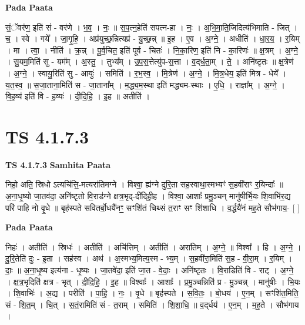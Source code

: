 \documentclass[17pt]{extarticle}
\begin{document}
\textbf{Pada Paata} \newline

सं॒ॅवर॑ण॒ इति॑ सं - वर॑णे । भ॒व॒ । नः॒ ॥ स॒प॒त्न॒हेति॑ सपत्न-हा । नः॒ । अ॒भि॒मा॒ति॒जिदित्य॑भिमाति - जित् । च॒ । स्वे । गये᳚ । जा॒गृ॒हि॒ । अप्र॑युच्छ॒न्नित्यप्र॑ - यु॒च्छ॒न्न् ॥ इ॒ह । ए॒व । अ॒ग्ने॒ । अधीति॑ । धा॒र॒य॒ । र॒यिम् । मा । त्वा॒ । नीति॑ । क्र॒न्न् । पू॒र्व॒चित॒ इति॑ पूर्व - चितः॑ । नि॒का॒रिण॒ इति॑ नि - का॒रिणः॑ ॥ क्ष॒त्रम् । अ॒ग्ने॒ । सु॒यम॒मिति॑ सु - यम᳚म् । अ॒स्तु॒ । तुभ्य᳚म् । उ॒प॒स॒त्तेत्यु॑प-स॒त्ता । व॒द्‌र्ध॒ता॒म् । ते॒ । अनि॑ष्टृतः ॥ क्ष॒त्रेण॑ । अ॒ग्ने॒ । स्वायु॒रिति॑ सु - आयुः॑ । समिति॑ । र॒भ॒स्व॒ । मि॒त्रेण॑ । अ॒ग्ने॒ । मि॒त्र॒धेय॒ इति॑ मित्र - धेये᳚ । य॒त॒स्व॒ ॥ स॒जा॒ताना॒मिति॑ स - जा॒ताना᳚म् । म॒द्ध्य॒म॒स्था इति॑ मद्ध्यम-स्थाः । ए॒धि॒ । राज्ञा᳚म् । अ॒ग्ने॒ । वि॒ह॒व्य॑ इति॑ वि - ह॒व्यः॑ । दी॒दि॒हि॒ । इ॒ह ॥ अतीति॑ ।  \newline





\section{ TS 4.1.7.3 }

\textbf{TS 4.1.7.3 } \newline
\textbf{Samhita Paata} \newline

निहो॒ अति॒ स्रिधो ऽत्यचि॑त्ति॒-मत्यरा॑तिमग्ने । विश्वा॒ ह्य॑ग्ने दुरि॒ता सह॒स्वाथा॒स्मभ्यꣳ॑ स॒हवी॑राꣳ र॒यिन्दाः᳚ ॥ अ॒ना॒धृ॒ष्यो जा॒तव॑दा॒ अनि॑ष्टृतो वि॒राड॑ग्ने क्षत्र॒भृद्-दी॑दिही॒ह । विश्वा॒ आशाः᳚ प्रमु॒ञ्चन् मानु॑षीर्भि॒यः शि॒वाभि॑र॒द्य परि॑ पाहि नो वृ॒धे ॥ बृह॑स्पते सवितर्बो॒धयै॑नꣳ॒॒ सꣳशि॑तं चिथ्सं त॒राꣳ सꣳ शि॑शाधि । व॒र्द्धयै॑नं मह॒ते सौभ॑गाय॒- [  ] \newline

\textbf{Pada Paata} \newline

निहः॑ । अतीति॑ । स्रिधः॑ । अतीति॑ । अचि॑त्तिम् । अतीति॑ । अरा॑तिम् । अ॒ग्ने॒ ॥ विश्वा᳚ । हि । अ॒ग्ने॒ । दु॒रि॒तेति॑ दुः - इ॒ता । सह॑स्व । अथ॑ । अ॒स्मभ्य॒मित्य॒स्म - भ्य॒म् । स॒हवी॑रा॒मिति॑ स॒ह - वी॒रा॒म् । र॒यिम् । दाः॒ ॥ अ॒ना॒धृ॒ष्य इत्य॑ना - धृ॒ष्यः । जा॒तवे॑दा॒ इति॑ जा॒त - वे॒दाः॒ । अनि॑ष्टृतः । वि॒राडिति॑ वि - राट् । अ॒ग्ने॒ । क्ष॒त्र॒भृदिति॑ क्षत्र - भृत् । दी॒दि॒हि॒ । इ॒ह ॥ विश्वाः᳚ । आशाः᳚ । प्र॒मु॒ञ्चन्निति॑ प्र - मु॒ञ्चन्न् । मानु॑षीः । भि॒यः । शि॒वाभिः॑ । अ॒द्य । परीति॑ । पा॒हि॒ । नः॒ । वृ॒धे ॥ बृह॑स्पते । स॒वि॒तः॒ । बो॒धय॑ । ए॒न॒म् । सꣳशि॑त॒मिति॒ सं - शि॒त॒म् । चि॒त् । स॒तं॒रामिति॑ सं - त॒राम् । समिति॑ । शि॒शा॒धि॒ ॥ व॒द्‌र्धय॑ । ए॒न॒म् । म॒ह॒ते । सौभ॑गाय ।  \newline
\end{document}
